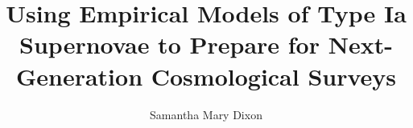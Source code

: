 \documentclass{ucbthesis}
\begin{document}

\title{Using Empirical Models of Type Ia Supernovae to Prepare for Next-Generation Cosmological Surveys}
\author{Samantha Mary Dixon}


\maketitle
\approvalpage
\copyrightpage


\end{document}
